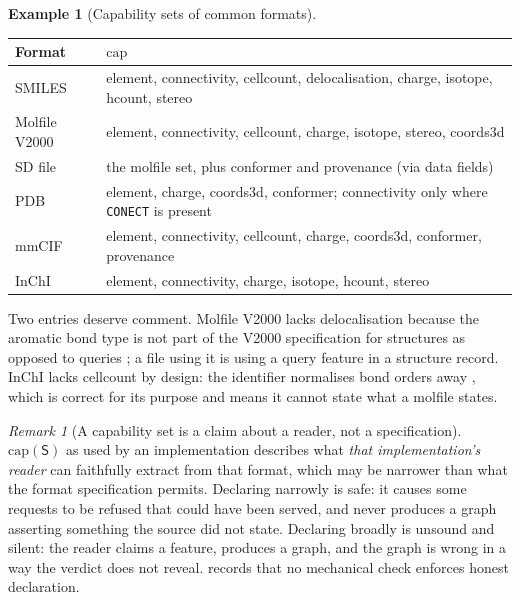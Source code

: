 \documentclass[11pt,twocolumn,a4paper]{article}
\theoremstyle{msthm}
\theoremstyle{definition}
\newtheorem{example}[theorem]{Example}
\theoremstyle{remark}
\newtheorem{remark}[theorem]{Remark}
\newcommand{\ms}[1]{\texttt{#1}}
\newcommand{\Src}{\mathsf{S}}
\newcommand{\Capset}{\mathrm{cap}}
\begin{document}
\begin{example}[Capability sets of common formats]
\label{ex:caps}
\leavevmode
\begin{center}
\small
\begin{tabular}{@{}lp{}@{}}
\toprule
Format & $\Capset$\\
\midrule
SMILES & \textsf{element}, \textsf{connectivity}, \textsf{cellcount},
\textsf{delocalisation}, \textsf{charge}, \textsf{isotope},
\textsf{hcount}, \textsf{stereo}\\
Molfile V2000 & \textsf{element}, \textsf{connectivity},
\textsf{cellcount}, \textsf{charge}, \textsf{isotope}, \textsf{stereo},
\textsf{coords3d}\\
SD file & the molfile set, plus \textsf{conformer} and
\textsf{provenance} (via data fields)\\
PDB & \textsf{element}, \textsf{charge}, \textsf{coords3d},
\textsf{conformer}; \textsf{connectivity} only where \ms{CONECT} is
present\\
mmCIF & \textsf{element}, \textsf{connectivity}, \textsf{cellcount},
\textsf{charge}, \textsf{coords3d}, \textsf{conformer},
\textsf{provenance}\\
InChI & \textsf{element}, \textsf{connectivity}, \textsf{charge},
\textsf{isotope}, \textsf{hcount}, \textsf{stereo}\\
\bottomrule
\end{tabular}
\end{center}
Two entries deserve comment. Molfile V2000 lacks
\textsf{delocalisation} because the aromatic bond type is not part of
the V2000 specification for structures as opposed to queries
\citep{dalby1992ctfile}; a file using it is using a query feature in a
structure record. InChI lacks \textsf{cellcount} by design: the
identifier normalises bond orders away
\citep{heller2015inchi}, which is correct for its purpose and means it
cannot state what a molfile states.
\end{example}

\begin{remark}[A capability set is a claim about a reader, not a
specification]
\label{rem:cap-claim}
$\Capset(\Src)$ as used by an implementation describes what \emph{that
implementation's reader} can faithfully extract from that format, which
may be narrower than what the format specification permits. Declaring
narrowly is safe: it causes some requests to be refused that could have
been served, and never produces a graph asserting something the source
did not state. Declaring broadly is unsound and silent: the reader
claims a feature, produces a graph, and the graph is wrong in a way the
verdict does not reveal.  records that no mechanical
check enforces honest declaration.
\end{remark}
\end{document}
